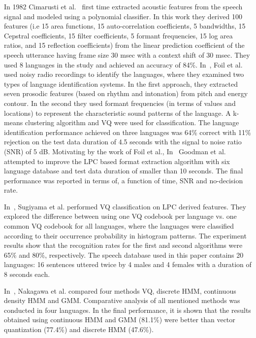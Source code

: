 \begin{spacing}{1.5}
In 1982 Cimarusti et al.~\cite{cimarusti1982development} first time extracted acoustic features from the speech signal and modeled using a polynomial classifier. In this work they derived 100 features (i.e 15 area functions, 15 auto-correlation coefficients, 5 bandwidths, 15 Cepstral coefficients, 15 filter coefficients, 5 formant frequencies, 15 log area ratios, and 15 reflection coefficients) from the linear prediction coefficient of the speech utterance having frame size 30 msec with a context shift of 30 msec. They used 8 languages in the study and achieved an accuracy of 84\%. In~\cite{foil1986language}, Foil et al. used noisy radio recordings to identify the languages, where they examined two types of language identification systems. In the first approach, they extracted seven prosodic features (based on rhythm and intonation) from pitch and energy contour. In the second they used formant frequencies (in terms of values and locations) to represent the characteristic sound patterns of the language. A k-means clustering algorithm and VQ were used for classification. The language identification performance achieved on three languages was 64\% correct with 11\% rejection on the test data duration of 4.5 seconds with the signal to noise ratio (SNR) of 5 dB. Motivating by the work of Foil et al., In~\cite{goodman1989improved} Goodman et al. attempted to improve the LPC based format extraction algorithm with six language database and test data duration of smaller than 10 seconds. The final performance was reported in terms of, a function of time, SNR and no-decision rate. 

In~\cite{sugiyama1991automatic}, Sugiyama et al. performed VQ classification on LPC derived features. They explored the difference between using one VQ codebook per language vs. one common VQ codebook for all languages, where the languages were classified according to their occurrence probability in histogram patterns. The experiment results show that the recognition rates for the first and second algorithms were 65\% and 80\%, respectively. The speech database used in this paper contains 20 languages: 16 sentences uttered twice by 4 males and 4 females with a duration of 8 seconds each.

In~\cite{nakagawa1992speaker}, Nakagawa et al. compared four methods VQ, discrete HMM, continuous density HMM and GMM. Comparative analysis of all mentioned methods was conducted in four languages. In the final performance, it is shown that the results obtained using continuous HMM and GMM (81.1\%) were better than vector quantization (77.4\%) and discrete HMM (47.6\%).


\end{spacing}
